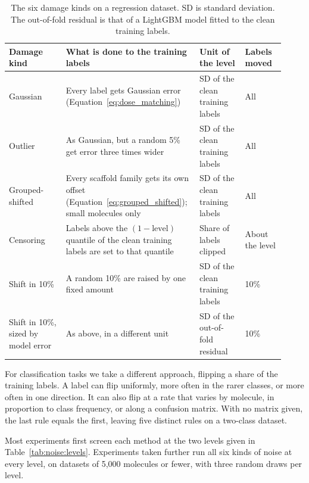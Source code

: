 \begin{table}[htbp]
\centering
\small
\begin{adjustbox}{max width=\textwidth,max totalheight=0.78\textheight}
\begin{tabular}{@{}P{0.20\linewidth}P{0.42\linewidth}P{0.16\linewidth}P{0.14\linewidth}@{}}
\toprule
Damage kind & What is done to the training labels & Unit of the level & Labels moved \\
\midrule
Gaussian & Every label gets Gaussian error (Equation~\ref{eq:dose_matching}) & SD of the clean training labels & All \\
Outlier & As Gaussian, but a random 5\% get error three times wider & SD of the clean training labels & All \\
Grouped-shifted & Every scaffold family gets its own offset (Equation~\ref{eq:grouped_shifted}); small molecules only & SD of the clean training labels & All \\
Censoring & Labels above the $(1 - \text{level})$ quantile of the clean training labels are set to that quantile & Share of labels clipped & About the level \\
Shift in 10\% & A random 10\% are raised by one fixed amount & SD of the clean training labels & 10\% \\
Shift in 10\%, sized by model error & As above, in a different unit & SD of the out-of-fold residual & 10\% \\
\bottomrule
\end{tabular}
\end{adjustbox}
\caption[Damage kinds on a regression dataset.]{The six damage kinds on a regression dataset. SD is standard deviation. The out-of-fold residual is that of a LightGBM model fitted to the clean training labels.}
\label{tab:noise:kinds}
\end{table}

For classification tasks we take a different approach, flipping a share of the training labels. A label can flip uniformly, more often in the rarer classes, or more often in one direction. It can also flip at a rate that varies by molecule, in proportion to class frequency, or along a confusion matrix. With no matrix given, the last rule equals the first, leaving five distinct rules on a two-class dataset.

Most experiments first screen each method at the two levels given in Table~\ref{tab:noise:levels}. Experiments taken further run all six kinds of noise at every level, on datasets of 5,000 molecules or fewer, with three random draws per level.

